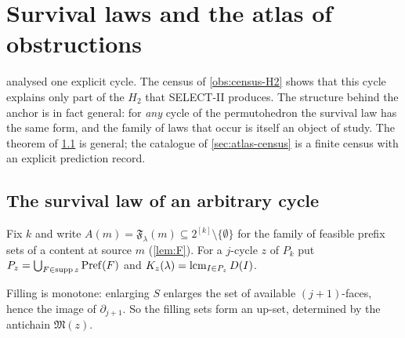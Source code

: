 \chapter{Survival laws and the atlas of obstructions}\label{ch:atlas}

 analysed one explicit cycle. The census of \cref{obs:census-H2} shows that this cycle explains only part of the $H_2$ that SELECT-II produces. The structure behind the anchor is in fact general: for \emph{any} cycle of the permutohedron the survival law has the same form, and the family of laws that occur is itself an object of study. The theorem of \cref{sec:atlas-law} is general; the catalogue of \cref{sec:atlas-census} is a finite census with an explicit prediction record.

\section{The survival law of an arbitrary cycle}\label{sec:atlas-law}
Fix $k$ and write $A(m)=\mathfrak F_\lambda(m)\subseteq 2^{[k]}\setminus\{\emptyset\}$ for the family of feasible prefix sets of a content at source $m$ (\cref{lem:F}). For a $j$-cycle $z$ of $P_k$ put $P_z=\bigcup_{F\in\operatorname{supp}z}\mathrm{Pref}(F)$ and $K_z(\lambda)=\operatorname{lcm}_{I\in P_z}D(I)$.
Filling is monotone: enlarging $S$ enlarges the set of available $(j{+}1)$-faces, hence the image of $\partial_{j+1}$. So the filling sets form an up-set, determined by the antichain $\mathfrak M(z)$.
